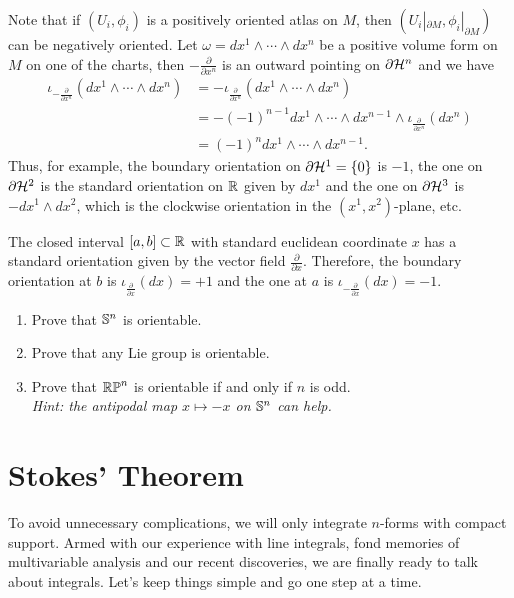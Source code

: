 Note that if $(U_i, \phi_i)$ is a positively oriented atlas on $M$, then $(U_i|_{\partial M}, \phi_i|_{\partial M})$ can be negatively oriented. 
Let $\omega = dx^1\wedge\cdots\wedge dx^n$ be a positive volume form on $M$ on one of the charts, then $-\frac{\partial}{\partial x^n}$ is an outward pointing on $\partial \mathcal{H}^n$ and we have
\begin{align}
  \iota_{-\frac{\partial}{\partial x^n}} (dx^1\wedge\cdots\wedge dx^n)
  &= -\iota_{\frac{\partial}{\partial x^n}} (dx^1\wedge\cdots\wedge dx^n) \\
  &= -(-1)^{n-1} dx^1\wedge\cdots\wedge dx^{n-1}\wedge \iota_{\frac{\partial}{\partial x^n}} (dx^n) \\
  &= (-1)^n dx^1\wedge\cdots\wedge dx^{n-1}.
\end{align}
Thus, for example, the boundary orientation on $\partial \mathcal{H}^1 = \{0\}$ is $-1$, the one on $\partial \mathcal{H}^2$ is the standard orientation on $\mathbb{R}$ given by $dx^1$ and the one on $\partial \mathcal{H}^3$ is $-dx^1\wedge dx^2$, which is the clockwise orientation in the $(x^1, x^2)$-plane, etc.

\begin{example}
  The closed interval $[a,b]\subset\mathbb{R}$ with standard euclidean coordinate $x$ has a standard orientation given by the vector field $\frac{\partial}{\partial x}$. 
  Therefore, the boundary orientation at $b$ is $\iota_{\frac{\partial}{\partial x}}(dx) = +1$ and the one at $a$ is $\iota_{-\frac{\partial}{\partial x}}(dx) = -1$.
\end{example}

\begin{exercise}
  \begin{enumerate}
    \item Prove that $\mathbb{S}^n$ is orientable.
    \item Prove that any Lie group is orientable.
    \item Prove that $\mathbb{RP}^n$ is orientable if and only if $n$ is odd. \\
      \textit{\small Hint: the antipodal map $x\mapsto -x$ on $\mathbb{S}^n$ can help.}
  \end{enumerate}
\end{exercise}

\section{Stokes' Theorem}

To avoid unnecessary complications, we will only integrate $n$-forms with compact support.
Armed with our experience with line integrals, fond memories of multivariable analysis and our recent discoveries, we are finally ready to talk about integrals.
Let's keep things simple and go one step at a time.

